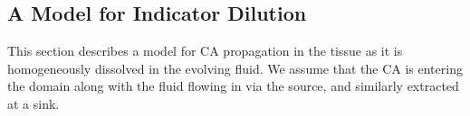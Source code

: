 \documentclass[journal,twocolumn]{IEEEtran}
\begin{document}
	\subsection{A Model for Indicator Dilution}\label{sec:transport}

	This section describes a model for  CA propagation in the tissue as it is homogeneously dissolved in the evolving fluid.
	We assume that the CA is entering the domain along with the fluid flowing in via the source, and similarly extracted at a sink.
	
\end{document}
